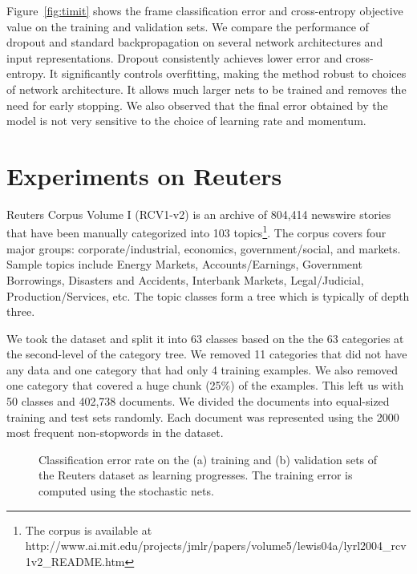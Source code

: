 \documentclass[12pt]{article}
\begin{document}
Figure~\ref{fig:timit} shows the frame classification error and cross-entropy
objective value on the training and validation sets. We compare the performance
of dropout and standard backpropagation on several network architectures and
input representations. Dropout consistently achieves lower error and
cross-entropy. It significantly controls overfitting, making the method robust
to choices of network architecture. It allows much larger nets to be trained and removes
the need for early stopping. We also observed that the final error obtained by
the model is not very sensitive to the choice of learning rate and momentum.

\section{Experiments on Reuters}
\label{reuterssom}

Reuters Corpus Volume I (RCV1-v2) \cite{Lewis2004} is an archive of 
804,414 newswire stories that have been manually categorized into 103 topics\footnote{The corpus is
available at http://www.ai.mit.edu/projects/jmlr/papers/volume5/lewis04a/lyrl2004\_rcv1v2\_README.htm}. 
The corpus 
covers four major groups: corporate/industrial, economics, government/social, and markets. 
Sample topics include Energy Markets, Accounts/Earnings, Government Borrowings, Disasters and 
Accidents, Interbank Markets, Legal/Judicial, Production/Services, etc. The topic classes form 
a tree which is typically of depth three.

We took the dataset and split it into 63 classes based on the 
the 63 categories at the second-level of the category tree.
We removed 11 categories that did not have any data and one category that
had only 4 training examples. We also removed one category that covered a huge
chunk (25\%) of the examples. This left us with 50 classes and 402,738 documents.
We divided the documents into equal-sized training and test sets randomly. Each
document was represented using the 2000 most frequent non-stopwords in the dataset.

\begin{figure}[h]
\caption{Classification error rate on the (a) training and (b) validation sets of the Reuters dataset as learning progresses.
The training error is computed using the stochastic nets.}
\label{fig:reuters}
\end{figure}
\end{document}
